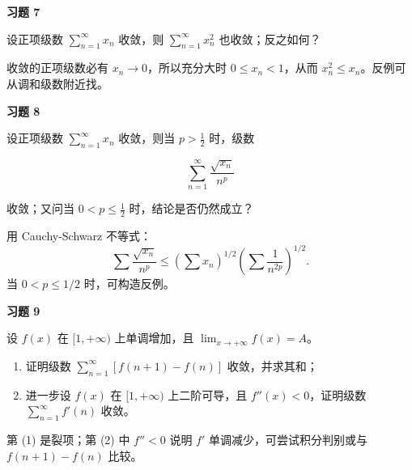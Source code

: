 \begin{exercisebox}
\textbf{习题 7 }

设正项级数 \(\sum_{n=1}^{\infty}x_n\) 收敛，则 \(\sum_{n=1}^{\infty}x_n^2\) 也收敛；反之如何？

\begin{hintbox}
收敛的正项级数必有 \(x_n\to0\)，所以充分大时 \(0\le x_n<1\)，从而 \(x_n^2\le x_n\)。反例可从调和级数附近找。
\end{hintbox}
\end{exercisebox}

\begin{exercisebox}
\textbf{习题 8 }

设正项级数 \(\sum_{n=1}^{\infty}x_n\) 收敛，则当 \(p>\frac12\) 时，级数

\[
      \sum_{n=1}^{\infty}\frac{\sqrt{x_n}}{n^p}
      \]

收敛；又问当 \(0<p\le\frac12\) 时，结论是否仍然成立？

\begin{hintbox}
用 Cauchy-Schwarz 不等式： \[
        \sum \frac{\sqrt{x_n}}{n^p}
        \le
        \left(\sum x_n\right)^{1/2}
        \left(\sum \frac1{n^{2p}}\right)^{1/2}.
        \] 当 \(0<p\le1/2\) 时，可构造反例。
\end{hintbox}
\end{exercisebox}

\begin{exercisebox}
\textbf{习题 9 }

设 \(f(x)\) 在 \([1,+\infty)\) 上单调增加，且 \(\lim_{x\to+\infty}f(x)=A\)。

\begin{enumerate}
 \item 证明级数 \(\sum_{n=1}^{\infty}[f(n+1)-f(n)]\) 收敛，并求其和；
 \item 进一步设 \(f(x)\) 在 \([1,+\infty)\) 上二阶可导，且 \(f''(x)<0\)，证明级数 \(\sum_{n=1}^{\infty}f'(n)\) 收敛。
 \end{enumerate}

\begin{hintbox}
第 (1) 是裂项；第 (2) 中 \(f''<0\) 说明 \(f'\) 单调减少，可尝试积分判别或与 \(f(n+1)-f(n)\) 比较。
\end{hintbox}
\end{exercisebox}

